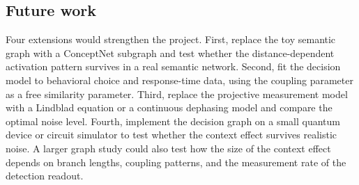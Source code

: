 \subsection{Future work}
\label{sec:discussion-future}

Four extensions would strengthen the project. First, replace the toy semantic
graph with a ConceptNet subgraph and test whether the distance-dependent
activation pattern survives in a real semantic network. Second, fit the
decision model to behavioral choice and response-time data, using the coupling
parameter as a free similarity parameter. Third, replace the projective
measurement model with a Lindblad equation or a continuous dephasing model and
compare the optimal noise level. Fourth, implement the decision graph on a
small quantum device or circuit simulator to test whether the context effect
survives realistic noise. A larger graph study could also test how the size
of the context effect depends on branch lengths, coupling patterns, and the
measurement rate of the detection readout.

